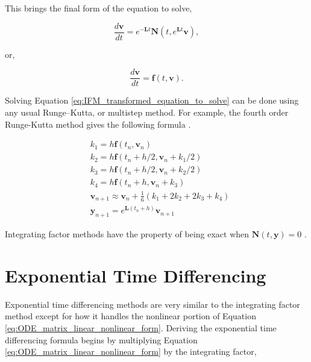 \noindent
This brings the final form of the equation to solve, 

\begin{equation}
    \frac{d\boldsymbol{v}}{dt} = e^{-\boldsymbol{L}t}\boldsymbol{N}(t,e^{\boldsymbol{L}t}\boldsymbol{v}), 
\end{equation}{}

\noindent
or, 

\begin{equation}
    \frac{d\boldsymbol{v}}{dt} = \boldsymbol{f}(t,\boldsymbol{v}).
    \label{eq:IFM_transformed_equation_to_solve}
\end{equation}{}

Solving Equation \ref{eq:IFM_transformed_equation_to_solve} can be done using any usual Runge–Kutta, or multistep method. For example, the fourth order Runge-Kutta method gives the following formula \cite{Kassam2005}.


\begin{equation}
\begin{split}
    & k_{1} = h\boldsymbol{f}(t_{n},\boldsymbol{v}_{n}) \\
    & k_{2} = h\boldsymbol{f}(t_{n}+h/2, \boldsymbol{v}_{n} + k_{1}/2) \\
    & k_{3} = h\boldsymbol{f}(t_{n}+h/2, \boldsymbol{v}_{n} + k_{2}/2) \\
    & k_{4} = h\boldsymbol{f}(t_{n}+h, \boldsymbol{v}_{n} + k_{3}) \\
    & \boldsymbol{v}_{n+1} \approx \boldsymbol{v}_{n} + \frac{1}{6}(k_{1} + 2k_{2} + 2k_{3} + k_{4}) \\
    & \boldsymbol{y}_{n+1} = e^{\boldsymbol{L} (t_{n}+h)}\boldsymbol{v}_{n+1}
\end{split}
\end{equation}{}

Integrating factor methods have the property of being exact when $\boldsymbol{N}(t,\boldsymbol{y}) = 0$ \cite{ash2009}. 

\section{Exponential Time Differencing}
Exponential time differencing methods are very similar to the integrating factor method except for how it handles the nonlinear portion of Equation \ref{eq:ODE_matrix_linear_nonlinear_form}. Deriving the exponential time differencing formula begins by multiplying Equation \ref{eq:ODE_matrix_linear_nonlinear_form} by the integrating factor,


